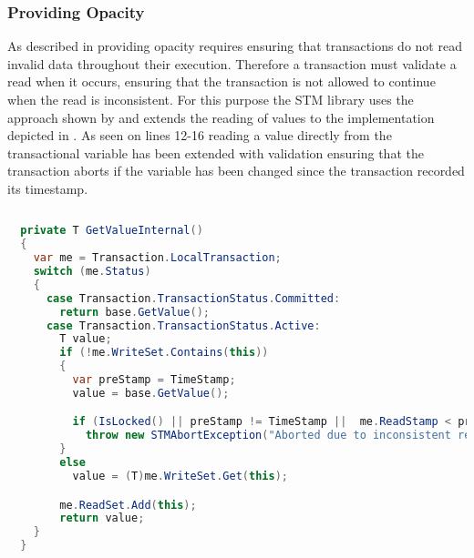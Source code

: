 \subsubsection{Providing Opacity}As described in  providing opacity requires ensuring that transactions do not read invalid data throughout their execution. Therefore a transaction must validate a read when it occurs, ensuring that the transaction is not allowed to continue when the read is inconsistent. For this purpose the \ac{STM} library uses the approach shown by \cite[p. 117]{harris2010transactional} and extends the reading of values to the implementation depicted in . As seen on lines 12-16 reading a value directly from the transactional variable has been extended with validation ensuring that the transaction aborts if the variable has been changed since the transaction recorded its timestamp.
\begin{lstlisting}[label=lst:library_opacity,
  caption={Providing Opacity},
  language=Java,  
  showspaces=false,
  showtabs=false,
  breaklines=true,
  showstringspaces=false,
  breakatwhitespace=true,
  commentstyle=\color{greencomments},
  keywordstyle=\color{bluekeywords},
  stringstyle=\color{redstrings},
  morekeywords={atomic, retry, orElse, var, get, set}]  % Start your code-block
  
  private T GetValueInternal()
  {
    var me = Transaction.LocalTransaction;
    switch (me.Status)
    {
      case Transaction.TransactionStatus.Committed:
        return base.GetValue();
      case Transaction.TransactionStatus.Active:
        T value;
        if (!me.WriteSet.Contains(this))
        {
          var preStamp = TimeStamp;
          value = base.GetValue();

          if (IsLocked() || preStamp != TimeStamp ||  me.ReadStamp < preStamp)
            throw new STMAbortException("Aborted due to inconsistent read");
        }
        else
          value = (T)me.WriteSet.Get(this);

        me.ReadSet.Add(this);
        return value;
    }
  }
\end{lstlisting}

\worksheetend